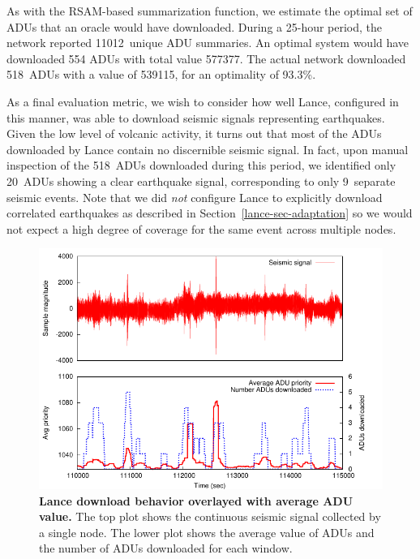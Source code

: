 
As with the RSAM-based summarization function, we estimate the optimal set of
ADUs that an oracle would have downloaded. During a 25-hour period, the
network reported 11012~unique ADU summaries. An optimal system would have
downloaded 554 ADUs with total value 577377.  The actual network
downloaded 518~ADUs with a value of 539115, for an optimality of 93.3\%. 


As a final evaluation metric, we wish to consider how well Lance, configured
in this manner, was able to download seismic signals representing
earthquakes. Given the low level of volcanic activity, it turns out that most
of the ADUs downloaded by Lance contain no discernible seismic signal. In
fact, upon manual inspection of the 518~ADUs downloaded during this period,
we identified only 20~ADUs showing a clear earthquake signal, corresponding
to only 9~separate seismic events. Note that we did {\em not} configure Lance
to explicitly download correlated earthquakes as described in
Section~\ref{lance-sec-adaptation} so we would not expect a high degree of
coverage for the same event across multiple nodes.

\begin{figure}[t]
\label{lance-fig-downloads-cont}
\begin{center}
\includegraphics[width=1.0\hsize]{./4-lance/figs/deploy/deploydownloads/everything.pdf}
\end{center}
\caption{\textbf{Lance download behavior overlayed with average ADU value.}
The top plot shows the continuous seismic signal collected by a single node.
The lower plot shows the average value of ADUs and the number of ADUs
downloaded for each window.}
\end{figure}

